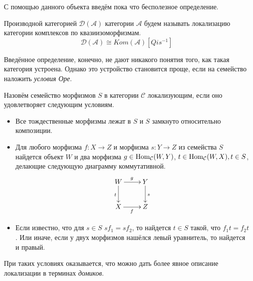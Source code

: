 \documentclass[../main.tex]{subfiles}
\begin{document}
  С помощью данного объекта введём пока что бесполезное определение.
  \begin{to_def}\label{DerCat}
    Производной категорией $\mathcal{D}(\mathcal{A})$ категории $\mathcal{A}$ будем называть локализацию категории комплексов по квазиизоморфизмам.
    \begin{equation*}
      \mathcal{D}(\mathcal{A}) \cong Kom(\mathcal{A})[Qis^{-1}]
    \end{equation*}
\end{to_def}

Введённое определение, конечно, не дают никакого понятия того, как такая категория устроена. 
Однако это устройство становится проще, если на семейство наложить \emph{условия Оре}.

\begin{to_def}
    Назовём семейство морфизмов $S$ в категории $\mathcal{C}$ локализующим, если оно удовлетворяет следующим условиям.
    \begin{itemize}
      \item Все тождественные морфизмы лежат в $S$ и $S$ замкнуто относительно композиции.
      \item Для любого морфизма $f:X\to Z$ и морфизма $s:Y\to Z$ из семейства $S$ найдется объект $W$ и два морфизма $g\in \operatorname{Hom}_\mathcal{C}(W, Y)$, $t\in \operatorname{Hom}_\mathcal{C}(W, X), t\in S$, делающие следующую диаграмму коммутативной.
	\begin{equation}\label{ore_2_cond}
	  \xymatrix{W \ar[r]^g \ar[d]_t & Y\ar[d]^s\\
	  X \ar[r]_f & Z}
	\end{equation}
      \item Если известно, что для $s\in S$ $sf_1=sf_2$, то найдется $t\in S$ такой, что $f_1t=f_2t$. 
	Или иначе, если у двух морфизмов нашёлся левый уравнитель, то найдется и правый.
    \end{itemize}
      \label{ore_conditions}
    \end{to_def}

    При таких условиях оказывается, что можно дать более явное описание локализации в терминах \emph{домиков}.
\end{document}

